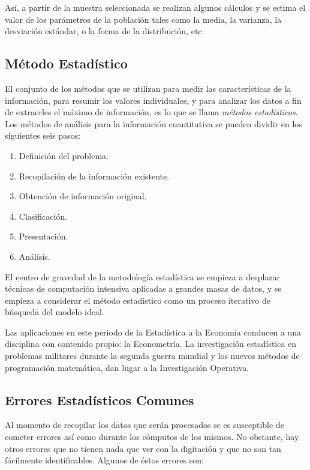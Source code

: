As\'i, a partir de la muestra seleccionada se realizan algunos c\'alculos y se estima el valor de los par\'ametros de la poblaci\'on tales como la media, la varianza, la desviaci\'on est\'andar, o la forma de la distribuci\'on, etc.

\subsection{M\'etodo Estad\'istico}

El conjunto de los m\'etodos que se utilizan para medir las caracter\'isticas de la informaci\'on, para resumir los valores individuales, y para analizar los datos a fin de extraerles el m\'aximo de informaci\'on, es lo que se llama \textit{m\'etodos estad\'isticos}. Los m\'etodos de an\'alisis para la informaci\'on cuantitativa se pueden dividir en los siguientes seis pasos:

\begin{enumerate}
    \item Definici\'on del problema.
    \item Recopilaci\'on de la informaci\'on existente.
    \item Obtenci\'on de informaci\'on original.
    \item Clasificaci\'on.
    \item Presentaci\'on.
    \item An\'alisis.
\end{enumerate}

El centro de gravedad de la metodolog\'ia estad\'istica se empieza a desplazar t\'ecnicas de computaci\'on intensiva aplicadas a grandes masas de datos, y se empieza a considerar el m\'etodo estad\'istico como un proceso iterativo de b\'usqueda del modelo ideal.

Las aplicaciones en este periodo de la Estad\'istica a la Econom\'ia conducen a una disciplina con contenido propio: la Econometr\'ia. La investigaci\'on estad\'istica en problemas militares durante la segunda guerra mundial y los nuevos m\'etodos de programaci\'on matem\'atica, dan lugar a la Investigaci\'on Operativa.

\subsection{Errores Estad\'isticos Comunes}

Al momento de recopilar los datos que ser\'an procesados se es susceptible de cometer errores as\'i como durante los c\'omputos de los mismos. No obstante, hay otros errores que no tienen nada que ver con la digitaci\'on y que no son tan f\'acilmente identificables. Algunos de \'estos errores son:

